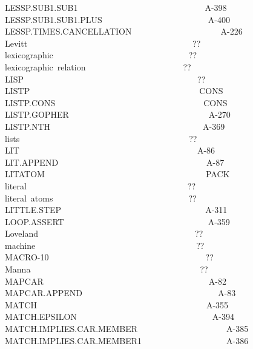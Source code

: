 \documentclass[11pt]{book}
\newenvironment{pubasis}{\begin{flushleft}\ttfamily\small}{\normalsize\rmfamily\end{flushleft}}
\begin{document}
\begin{pubasis}
LESSP.SUB1.SUB1~~~~~~~~~~~~~~~~~~~~~~~~~~~~~~A-398\\
LESSP.SUB1.SUB1.PLUS~~~~~~~~~~~~~~~~~~~~~~~~~A-400\\
LESSP.TIMES.CAN\-CELLATION~~~~~~~~~~~~~~~~~~~~~A-226\\
Levitt~~~~~~~~~~~~~~~~~~~~~~~~~~~~~~~~~~~~~~~??\\
lexicographic~~~~~~~~~~~~~~~~~~~~~~~~~~~~~~~~??\\
lexicographic~relation~~~~~~~~~~~~~~~~~~~~~~~??\\
LISP~~~~~~~~~~~~~~~~~~~~~~~~~~~~~~~~~~~~~~~~~??\\
LISTP~~~~~~~~~~~~~~~~~~~~~~~~~~~~~~~~~~~~~~~~CONS\\
LISTP.CONS~~~~~~~~~~~~~~~~~~~~~~~~~~~~~~~~~~~CONS\\
LISTP.GOPHER~~~~~~~~~~~~~~~~~~~~~~~~~~~~~~~~~A-270\\
LISTP.NTH~~~~~~~~~~~~~~~~~~~~~~~~~~~~~~~~~~~~A-369\\
lists~~~~~~~~~~~~~~~~~~~~~~~~~~~~~~~~~~~~~~~~??\\
LIT~~~~~~~~~~~~~~~~~~~~~~~~~~~~~~~~~~~~~~~~~~A-86\\
LIT.APPEND~~~~~~~~~~~~~~~~~~~~~~~~~~~~~~~~~~~A-87\\
LITATOM~~~~~~~~~~~~~~~~~~~~~~~~~~~~~~~~~~~~~~PACK\\
literal~~~~~~~~~~~~~~~~~~~~~~~~~~~~~~~~~~~~~~??\\
literal~atoms~~~~~~~~~~~~~~~~~~~~~~~~~~~~~~~~??\\
LITTLE.STEP~~~~~~~~~~~~~~~~~~~~~~~~~~~~~~~~~~A-311\\
LOOP.ASSERT~~~~~~~~~~~~~~~~~~~~~~~~~~~~~~~~~~A-359\\
Loveland~~~~~~~~~~~~~~~~~~~~~~~~~~~~~~~~~~~~~??\\
machine~~~~~~~~~~~~~~~~~~~~~~~~~~~~~~~~~~~~~~??\\
MACRO-10~~~~~~~~~~~~~~~~~~~~~~~~~~~~~~~~~~~~~??\\
Manna~~~~~~~~~~~~~~~~~~~~~~~~~~~~~~~~~~~~~~~~??\\
MAPCAR~~~~~~~~~~~~~~~~~~~~~~~~~~~~~~~~~~~~~~~A-82\\
MAPCAR.APPEND~~~~~~~~~~~~~~~~~~~~~~~~~~~~~~~~A-83\\
MATCH~~~~~~~~~~~~~~~~~~~~~~~~~~~~~~~~~~~~~~~~A-355\\
MATCH.EPSILON~~~~~~~~~~~~~~~~~~~~~~~~~~~~~~~~A-394\\
MATCH.IMPLIES.CAR.MEMBER~~~~~~~~~~~~~~~~~~~~~A-385\\
MATCH.IMPLIES.CAR.MEMBER1~~~~~~~~~~~~~~~~~~~~A-386\\

\end{pubasis}
\end{document}

